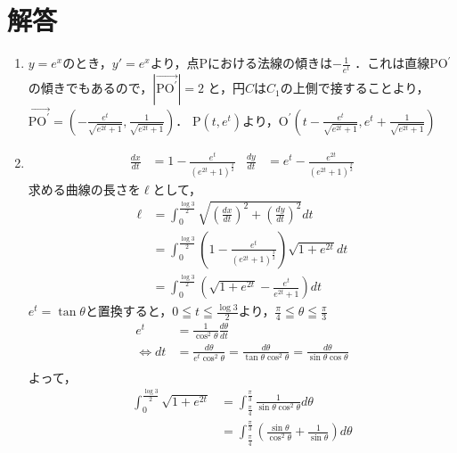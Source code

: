 \documentclass[a3paper,twocolumn,fleqn]{ltjsarticle}
\begin{document}
\section{解答}
\begin{enumerate}[(1)]
    \item $y=e^x$のとき，$y'=e^x$より，点Pにおける法線の傾きは$\displaystyle -\frac{1}{e^t}$ ．これは直線PO$^\prime$の傾きでもあるので，$\left| \overrightarrow{\mbox{PO}^\prime} \right| = 2$ と，円$C$は$C_1$の上側で接することより，\\
    $\displaystyle \overrightarrow{\mbox{PO}^\prime} = \left( -\frac{e^t}{\sqrt{e^{2t}+1}} , \frac{1}{\sqrt{e^{2t}+1}}\right)$．
    P$(t,e^t)$より，$\displaystyle \mbox{O}^\prime \left( t - \frac{e^t}{\sqrt{e^{2t}+1}} , e^t + \frac{1}{\sqrt{e^{2t}+1}}\right)$\\
    \item 
    \begin{align*}
        \frac{dx}{dt} &= 1-\frac{e^t}{{\left( e^{2t}+1 \right)}^\frac{3}{2}} & \frac{dy}{dt} &= e^t - \frac{e^{2t}}{{\left( e^{2t}+1 \right)}^\frac{3}{2}}
    \end{align*}
    求める曲線の長さを$\ell$として，
    \begin{align*}
        \ell &= \int_{0}^{\frac{\log3}{2}}\sqrt{\left( \frac{dx}{dt} \right)^2 + \left( \frac{dy}{dt} \right)^2} dt\\
        &= \int_{0}^{\frac{\log3}{2}} \left(1 - \frac{e^t}{\left(e^{2t} + 1\right)^\frac{3}{2}}\right)\sqrt{1+e^{2t}} dt\\
        &= \int_{0}^{\frac{\log3}{2}} \left(\sqrt{1+e^{2t}} - \frac{e^t}{e^{2t} + 1}\right) dt
    \end{align*}
    $e^t = \tan\theta$と置換すると，$\displaystyle 0\leqq t\leqq \frac{\log3}{2} $より，$\displaystyle \frac{\pi}{4} \leqq\theta\leqq\frac{\pi}{3}$
    \begin{align*}
        e^t &= \frac{1}{\cos^2\theta}\frac{d\theta}{dt}\\
        \Leftrightarrow dt &= \frac{d\theta}{e^t \cos^2\theta} = \frac{d\theta}{\tan\theta\cos^2\theta}= \frac{d\theta}{\sin\theta\cos\theta}\\
    \end{align*}
    よって，
    \begin{align*}
        \int_{0}^{\frac{\log3}{2}} \sqrt{1+e^{2t}} &= \int^{\frac{\pi}{3}}_{\frac{\pi}{4}} \frac{1}{\sin\theta \cos^2\theta} d\theta\\
        &= \int^{\frac{\pi}{3}}_{\frac{\pi}{4}} \left(\frac{\sin\theta}{\cos^2\theta} + \frac{1}{\sin\theta}\right) d\theta\\

\end{align*}
\end{enumerate}
\end{document}
